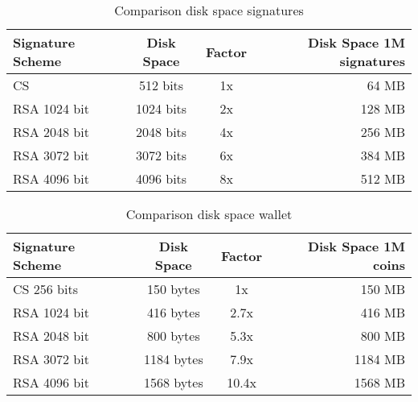 \begin{table}[ht]
    \centering
    \setupBfhTabular
    \begin{tabular}{lccr}
        \rowcolor{BFH-tablehead}
        \textbf{Signature Scheme} & \textbf{Disk Space} & \textbf{Factor} & \textbf{Disk Space 1M signatures}\\\hline
        CS & 512 bits & 1x & 64 MB\\\hline
        RSA 1024 bit & 1024 bits & 2x & 128 MB \\\hline
        RSA 2048 bit & 2048 bits & 4x & 256 MB\\\hline
        RSA 3072 bit & 3072 bits & 6x & 384 MB\\\hline
        RSA 4096 bit & 4096 bits & 8x & 512 MB\\\hline
    \end{tabular}
    \caption{Comparison disk space signatures}
    \label{tab:comp-sign-space}
\end{table}

\begin{table}[ht]
    \centering
    \setupBfhTabular
    \begin{tabular}{lccr}
        \rowcolor{BFH-tablehead}
        \textbf{Signature Scheme} & \textbf{Disk Space} & \textbf{Factor} & \textbf{Disk Space 1M coins}\\\hline
        CS 256 bits & 150 bytes & 1x & 150 MB\\\hline
        RSA 1024 bit & 416 bytes & 2.7x & 416 MB \\\hline
        RSA 2048 bit & 800 bytes & 5.3x & 800 MB\\\hline
        RSA 3072 bit & 1184 bytes & 7.9x & 1184 MB\\\hline
        RSA 4096 bit & 1568 bytes & 10.4x & 1568 MB\\\hline
    \end{tabular}
    \caption{Comparison disk space wallet}
    \label{tab:comp-wallet-space}
\end{table}

